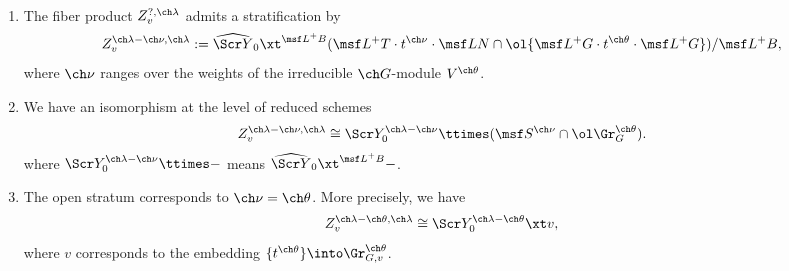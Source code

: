 \begin{prop-const} \label{prop:Yact-strat}
\
\begin{enumerate}
\item The fiber product $Z_v^{?,\ch\lambda}$ admits a stratification by
\[
    Z_v^{\ch\lambda-\ch\nu,\ch\lambda} :=
    \widehat{\Scr Y}_0 \xt^{\msf L^+B}
    (\msf L^+ T \cdot t^{\ch\nu}\cdot \msf L N \cap \ol{ \msf L^+G\cdot t^{\ch\theta} \cdot \msf L^+G}) / \msf L^+B,
\]
where $\ch\nu$ ranges over the weights of the irreducible $\ch G$-module $V^{\ch\theta}$.

\item
We have an isomorphism at the level of reduced schemes
\[ Z_v^{\ch\lambda-\ch\nu,\ch\lambda} \cong
\Scr Y_0^{\ch\lambda-\ch\nu} \ttimes
(\msf S^{\ch\nu} \cap \ol\Gr^{\ch\theta}_G). \]
where $\Scr Y_0^{\ch\lambda-\ch\nu} \ttimes -$
means
$\widehat{\Scr Y}_0
\xt^{\msf L^+B} -$.

\item
The open stratum corresponds to $\ch\nu=\ch\theta$. More precisely, we have
\[ Z_v^{\ch\lambda-\ch\theta,\ch\lambda} \cong \Scr Y_0^{\ch\lambda-\ch\theta} \xt v, \]
where $v$ corresponds to the embedding $\{ t^{\ch\theta} \}
\into \Gr^{\ch\theta}_{G,v}$.
\end{enumerate}
\end{prop-const}



